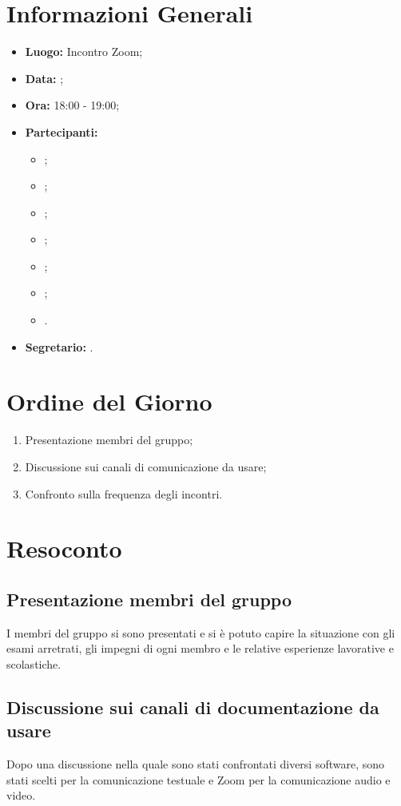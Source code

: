 \section{Informazioni Generali}
\begin{itemize}
\item \textbf{Luogo:} Incontro Zoom;
\item \textbf{Data:} \Data;
\item \textbf{Ora:} 18:00 - 19:00;
\item \textbf{Partecipanti:}
	\begin{itemize}
		\item \BL{}; 
		\item \FF{};
		\item \MM{}; 
		\item \PC{};
		\item \TG{};
		\item \TL{};
		\item \VD{}.
	\end{itemize} 
\item \textbf{Segretario:} \PC{}.
\end{itemize}

\section{Ordine del Giorno}
\begin{enumerate}
 \item Presentazione membri del gruppo;
 \item Discussione sui canali di comunicazione da usare;
 \item Confronto sulla frequenza degli incontri.
\end{enumerate}

\section{Resoconto}
\subsection{Presentazione membri del gruppo}
I membri del gruppo si sono presentati e si è potuto capire la situazione con gli esami arretrati, gli impegni di ogni membro e le relative esperienze lavorative e scolastiche.
\subsection{Discussione sui canali di documentazione da usare}
Dopo una discussione nella quale sono stati confrontati diversi software, sono stati scelti  per la comunicazione testuale e Zoom per la comunicazione audio e video.
